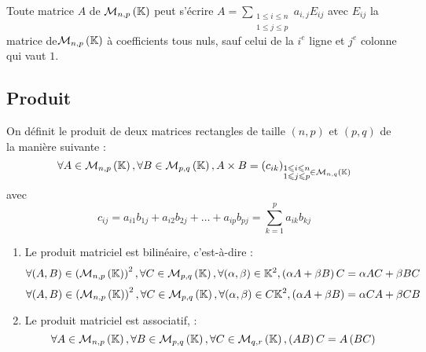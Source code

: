 \begin{defprop}
    Toute matrice \(A\) de \(\mathcal{M}_{n,p}\left(\mathbb{K}\right)\) peut s’écrire \(A = \sum_{\substack {1\leq i \leq n \\ 1\leq j \leq p}}a_{i,j}E_{ij}\) avec \(E_{ij}\) la matrice de\(\mathcal{M}_{n,p}\left(\mathbb{K}\right)\) à coefficients tous nuls, sauf celui de la \(i^e\) ligne et \(j^e\) colonne qui vaut \(1\).
\end{defprop}


\subsection{Produit}
\begin{defi}
    On définit le produit de deux matrices rectangles de taille \((n, p)\) et \((p, q)\) de la manière suivante :
    \[\forall A \in \mathcal{M}_{n,p}\left(\mathbb{K}\right),\forall B \in \mathcal{M}_{p,q}\left(\mathbb{K}\right), A \times B = \left(c_{ik}\right)_{{\substack {1\leqslant i \leqslant n \\ 1\leqslant j \leqslant p}} \in \mathcal{M}_{n,q}\left(\mathbb{K}\right)}\]
    avec 
    \[c_{ij} = a_{i1}b_{1j} + a_{i2} b_{2j} + \dots +a_{ip} b_{pj} = \sum_{k=1}^p a_{ik}b_{kj}\]
\end{defi}

\begin{prop}
    \begin{enumerate}
        \item Le produit matriciel est bilinéaire, c’est-à-dire :
         \[\forall (A,B) \in \left( \mathcal{M}_{n,p}\left(\mathbb{K}\right)\right)^2, \forall C \in  \mathcal{M}_{p,q}\left(\mathbb{K}\right), \forall (\alpha,\beta) \in \mathbb{K}^2, \left(\alpha A + \beta B\right)C = \alpha A C + \beta B C\]
         \[\forall (A,B) \in \left( \mathcal{M}_{n,p}\left(\mathbb{K}\right)\right)^2, \forall C \in  \mathcal{M}_{p,q}\left(\mathbb{K}\right), \forall (\alpha,\beta) \in C\mathbb{K}^2, \left(\alpha A + \beta B\right) = \alpha C A  + \beta C B\]
        \item Le produit matriciel est associatif, \cad : 
        \[\forall A \in  \mathcal{M}_{n,p}\left(\mathbb{K}\right), \forall B \in  \mathcal{M}_{p,q}\left(\mathbb{K}\right),\forall C \in  \mathcal{M}_{q,r}\left(\mathbb{K}\right) , \left(AB\right)C =   A \left(BC\right)\]
    \end{enumerate}
\end{prop}

